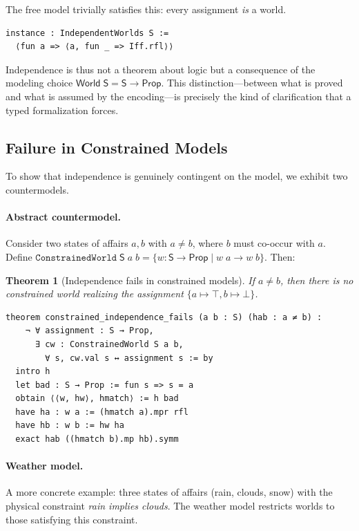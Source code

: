 \documentclass[10pt, letterpaper]{article}
\newtheorem{theorem}{Theorem}[section]
\theoremstyle{definition}
\theoremstyle{remark}
\newcommand{\Sach}{\mathsf{S}}
\newcommand{\World}{\mathsf{World}}
\newcommand{\Prop}{\mathsf{Prop}}
\begin{document}
\noindent
The free model trivially satisfies this: every assignment
\emph{is} a world.

\begin{lstlisting}
instance : IndependentWorlds S :=
  ⟨fun a => ⟨a, fun _ => Iff.rfl⟩⟩
\end{lstlisting}

\noindent
Independence is thus not a theorem about logic but a consequence
of the modeling choice $\World\;\Sach = \Sach \to \Prop$.
This distinction---between what is proved and what is assumed by
the encoding---is precisely the kind of clarification that a
typed formalization forces.

\subsection{Failure in Constrained Models}
\label{sec:constrained}

To show that independence is genuinely contingent on the model,
we exhibit two countermodels.

\paragraph{Abstract countermodel.}
Consider two states of affairs $a, b$ with $a \neq b$, where
$b$ must co-occur with $a$.  Define
$\mathtt{ConstrainedWorld}\;\Sach\;a\;b = \{w : \Sach \to \Prop
\mid w\;a \to w\;b\}$.  Then:

\begin{theorem}[Independence fails in constrained models]
\label{thm:constrained}
If $a \neq b$, then there is no constrained world realizing the
assignment $\{a \mapsto \top, b \mapsto \bot\}$.
\end{theorem}

\begin{lstlisting}
theorem constrained_independence_fails (a b : S) (hab : a ≠ b) :
    ¬ ∀ assignment : S → Prop,
      ∃ cw : ConstrainedWorld S a b,
        ∀ s, cw.val s ↔ assignment s := by
  intro h
  let bad : S → Prop := fun s => s = a
  obtain ⟨⟨w, hw⟩, hmatch⟩ := h bad
  have ha : w a := (hmatch a).mpr rfl
  have hb : w b := hw ha
  exact hab ((hmatch b).mp hb).symm
\end{lstlisting}

\paragraph{Weather model.}
A more concrete example: three states of affairs (rain, clouds,
snow) with the physical constraint \emph{rain implies clouds}.
The weather model restricts worlds to those satisfying this
constraint.
\end{document}
